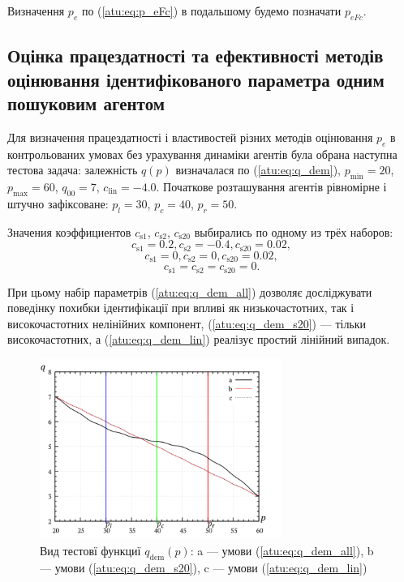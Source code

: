 Визначення $p_e$ по (\ref{atu:eq:p_eFc}) в подальшому будемо позначати $p_{eFc}$.



\subsection{Оцінка працездатності та ефективності методів оцінювання ідентифікованого параметра одним пошуковим агентом} %

Для визначення працездатності і властивостей різних методів оцінювання $p_e$
в контрольованих умовах без урахування динаміки агентів була обрана наступна
тестова задача: залежність $q (p)$ визначалася по (\ref{atu:eq:q_dem}),
$p_{\min}=20$, $p_{\max}=60$,
$q_{00}=7$, $c_\mathrm{lin}=-4.0$.
Початкове розташування агентів рівномірне і штучно зафіксоване:
$p_l=30$, $p_c=40$,  $p_r=50$.

Значения коэффициентов
$c_\mathrm{s1}$, $c_\mathrm{s2}$, $c_\mathrm{s20}$
выбирались по одному из трёх наборов:
%
\begin{equation}
  c_\mathrm{s1} = 0.2, c_\mathrm{s2} = -0.4, c_\mathrm{s20} = 0.02,
  \label{atu:eq:q_dem_all}
\end{equation}
%
\begin{equation}
  c_\mathrm{s1} = 0, c_\mathrm{s2} = 0, c_\mathrm{s20} = 0.02,
  \label{atu:eq:q_dem_s20}
\end{equation}
%
\begin{equation}
  c_\mathrm{s1} = c_\mathrm{s2} = c_\mathrm{s20} = 0 .
  \label{atu:eq:q_dem_lin}
\end{equation}

При цьому набір параметрів (\ref{atu:eq:q_dem_all}) дозволяє досліджувати
поведінку похибки ідентифікації при впливі як низькочастотних,
так і високочастотних нелінійних компонент,
(\ref{atu:eq:q_dem_s20}) ---
тільки високочастотних,
а (\ref{atu:eq:q_dem_lin})
реалізує простий лінійний випадок.

\begin{figure}[htb!]
  \begin{center}
    \includegraphics[width=0.7\textwidth]{p/q_p_dem.png}
  \end{center}
  \caption{Вид тестовї функциї $q_\mathrm{dem}(p)$:
     a --- умови (\ref{atu:eq:q_dem_all}),
     b --- умови (\ref{atu:eq:q_dem_s20}),
     c --- умови (\ref{atu:eq:q_dem_lin})
  }
  \label{atu:f:q_dem}
\end{figure}

